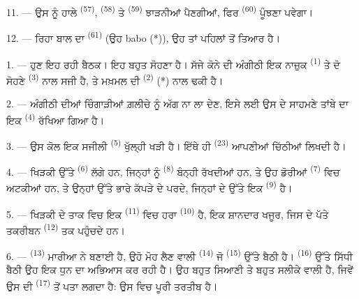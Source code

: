 

11. --- ਉਸ ਨੂੰ ਹਾਲੇ  \textsuperscript{(57)},
 \textsuperscript{(58)} ਤੇ 
\textsuperscript{(59)} ਝਾੜਨੀਆਂ ਪੈਣਗੀਆਂ, ਫਿਰ  \textsuperscript{(60)}
ਪੂੰਝਣਾ ਪਵੇਗਾ।

12. --- ਰਿਹਾ ਬਾਲ ਦਾ  \textsuperscript{(61)} (ਉਹ babo (*)), ਉਹ ਤਾਂ
ਪਹਿਲਾਂ ਤੋਂ ਤਿਆਰ ਹੈ।

\VUsaut{5.0mm}
\VUsaut{3.0mm}

1. --- ਹੁਣ ਇਹ ਰਹੀ ਬੈਠਕ। ਇਹ ਬਹੁਤ ਸੋਹਣਾ  ਹੈ। ਸੱਜੇ ਕੋਨੇ ਦੀ ਅੰਗੀਠੀ ਇਕ
ਨਾਜ਼ੁਕ  \textsuperscript{(1)} ਤੇ ਦੋ ਸੋਹਣੇ 
\textsuperscript{(3)} ਨਾਲ ਸਜੀ ਹੈ, ਤੇ ਮਖ਼ਮਲ ਦੀ  \textsuperscript{(2)}
(*) ਨਾਲ ਢਕੀ ਹੈ।

2. --- ਅੰਗੀਠੀ ਦੀਆਂ ਚਿੰਗਾੜੀਆਂ ਗ਼ਲੀਚੇ ਨੂੰ ਅੱਗ ਨਾ ਲਾ ਦੇਣ, ਇਸੇ ਲਈ ਉਸ ਦੇ ਸਾਹਮਣੇ
ਤਾਂਬੇ ਦਾ ਇਕ  \textsuperscript{(4)} ਰੱਖਿਆ ਗਿਆ ਹੈ।

3. --- ਉਸ ਕੋਲ ਇਕ ਸਜੀਲੀ  \textsuperscript{(5)} ਖੁੱਲ੍ਹੀ ਖੜੀ ਹੈ।
ਇੱਥੇ ਹੀ  \textsuperscript{(23)} ਆਪਣੀਆਂ ਚਿੱਠੀਆਂ ਲਿਖਦੀ ਹੈ।

4. --- ਖਿੜਕੀ ਉੱਤੇ  \textsuperscript{(6)} ਲੱਗੇ ਹਨ, ਜਿਨ੍ਹਾਂ
ਨੂੰ  \textsuperscript{(8)} ਬੰਨ੍ਹੀ ਰੱਖਦੀਆਂ ਹਨ, ਤੇ ਉਹ ਡੋਰੀਆਂ
 \textsuperscript{(7)} ਵਿਚ ਅਟਕੀਆਂ ਹਨ, ਤੇ ਉਨ੍ਹਾਂ ਉੱਤੇ ਭਾਰੇ ਕੱਪੜੇ
ਦੇ ਪਰਦੇ, ਜਿਨ੍ਹਾਂ ਦੇ ਉੱਤੇ ਇਕ  \textsuperscript{(9)} ਹੈ।

5. --- ਖਿੜਕੀ ਦੇ ਤਾਕ ਵਿਚ ਇਕ  \textsuperscript{(11)} ਵਿਚ ਹਰਾ
 \textsuperscript{(10)} ਹੈ, ਇਕ ਸ਼ਾਨਦਾਰ ਖਜੂਰ, ਜਿਸ ਦੇ ਪੱਤੇ ਤਕਰੀਬਨ
 \textsuperscript{(12)} ਤਕ ਪਹੁੰਚਦੇ ਹਨ।

6. ---  \textsuperscript{(13)} ਮਾਰੀਆ ਨੇ ਬਣਾਈ ਹੈ, ਉਹੋ ਮੋਹ ਲੈਣ
ਵਾਲੀ  \textsuperscript{(14)} ਜੋ  \textsuperscript{(15)}
ਉੱਤੇ ਬੈਠੀ ਹੈ।  \textsuperscript{(16)} ਉੱਤੇ ਸਿੱਧੀ ਬੈਠੀ ਉਹ ਇਕ ਧੁਨ ਦਾ
ਅਭਿਆਸ ਕਰ ਰਹੀ ਹੈ। ਉਹ ਬਹੁਤ ਸਿਆਣੀ ਤੇ ਬਹੁਤ ਸਲੀਕੇ ਵਾਲੀ ਹੈ, ਜਿਵੇਂ ਉਸ ਦੀ
 \textsuperscript{(17)} ਤੋਂ ਪਤਾ ਲਗਦਾ ਹੈ: ਉਸ ਵਿਚ ਪੂਰੀ
ਤਰਤੀਬ ਹੈ।

